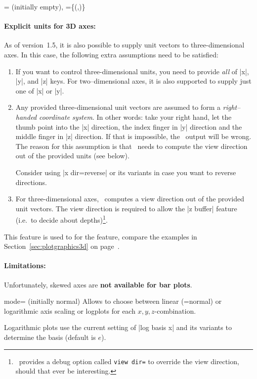 \begin{pgfplotsxykeylist}{
	\x= (initially empty),
	\x={\{(,)\}}}
\paragraph{Explicit units for 3D axes:} As of version~1.5, it is also possible to supply unit vectors to three-dimensional axes. In this case, the following extra assumptions need to be satisfied:
\begin{enumerate}
	\item If you want to control three-dimensional units, you need to provide \emph{all} of |x|, |y|, and |z| keys. For two--dimensional axes, it is also supported to supply just one of |x| or |y|.
	\item Any provided three-dimensional unit vectors are assumed to form a \emph{right--handed coordinate system}. In other words: take your right hand, let the thumb point into the |x| direction, the index finger in |y| direction and the middle finger in |z| direction. If that is impossible, the \PGFPlots\ output will be wrong. The reason for this assumption is that \PGFPlots\ needs to compute the view direction out of the provided units (see below).

	Consider using |x dir=reverse| or its variants in case you want to reverse directions.

	\item For three-dimensional axes, \PGFPlots\ computes a view direction out of the provided unit vectors. The view direction is required to allow the |z buffer| feature (i.e.\ to decide about depths)\footnote{\PGFPlots\ provides a debug option called \texttt{view dir=} to override the view direction, should that ever be interesting.}.
\end{enumerate}
This feature is used to for the  feature, compare the examples in Section~\ref{sec:plotgraphics3d} on page~\pageref{sec:plotgraphics3d}.

\paragraph{Limitations:} Unfortunately, skewed axes are \textbf{not available for bar plots}.
%
%
\end{pgfplotsxykeylist}

\begin{pgfplotsxykey}{\x mode= (initially normal)}
	Allows to choose between linear (=normal) or logarithmic axis scaling or logplots for each $x,y,z$-combination.

	Logarithmic plots use the current setting of |log basis x| and its variants to determine the basis (default is $e$).
\end{pgfplotsxykey}

